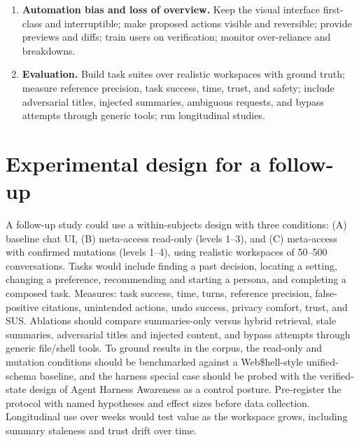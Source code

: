 \documentclass[11pt,a4paper]{article}
\begin{document}
\begin{enumerate}[leftmargin=*]
\item \textbf{Automation bias and loss of overview.} Keep the visual interface first-class and interruptible; make proposed actions visible and reversible; provide previews and diffs; train users on verification; monitor over-reliance and breakdowns.
\item \textbf{Evaluation.} Build task suites over realistic workspaces with ground truth; measure reference precision, task success, time, trust, and safety; include adversarial titles, injected summaries, ambiguous requests, and bypass attempts through generic tools; run longitudinal studies.
\end{enumerate}

\section{Experimental design for a follow-up}
A follow-up study could use a within-subjects design with three conditions: (A) baseline chat UI, (B) meta-access read-only (levels 1--3), and (C) meta-access with confirmed mutations (levels 1--4), using realistic workspaces of 50--500 conversations. Tasks would include finding a past decision, locating a setting, changing a preference, recommending and starting a persona, and completing a composed task. Measures: task success, time, turns, reference precision, false-positive citations, unintended actions, undo success, privacy comfort, trust, and SUS. Ablations should compare summaries-only versus hybrid retrieval, stale summaries, adversarial titles and injected content, and bypass attempts through generic file/shell tools. To ground results in the corpus, the read-only and mutation conditions should be benchmarked against a Web\$hell-style unified-schema baseline, and the harness special case should be probed with the verified-state design of Agent Harness Awareness as a control posture. Pre-register the protocol with named hypotheses and effect sizes before data collection. Longitudinal use over weeks would test value as the workspace grows, including summary staleness and trust drift over time.
\end{document}
